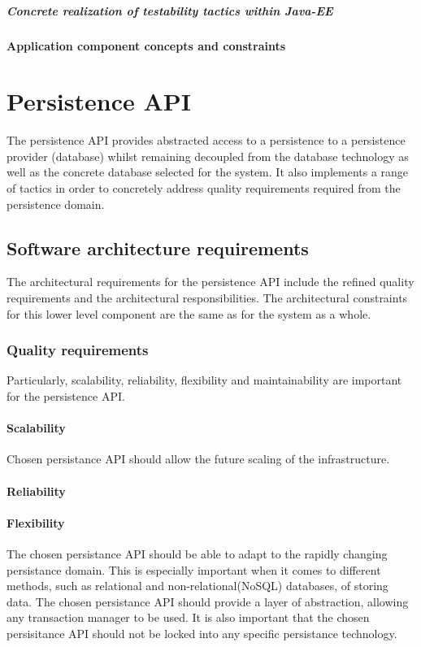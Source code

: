 \documentclass[a4paper,12pt]{report}
\begin{document}
\subparagraph {Concrete realization of testability tactics  within Java-EE}
\hfill \break

\paragraph {Application component concepts and constraints}


\section {Persistence API}
The persistence API provides abstracted access to a persistence to a persistence provider (database)
whilst remaining decoupled from the database technology as well as the concrete database selected
for the system. It also implements a range of tactics in order to concretely address quality requirements required from the persistence domain.

\subsection {Software architecture requirements}
The architectural requirements for the persistence API include the refined quality requirements and
the architectural responsibilities. The architectural constraints for this lower level component are
the same as for the system as a whole.

\subsubsection {Quality requirements}
Particularly, scalability, reliability, flexibility and maintainability are important for the persistence API.

\paragraph {Scalability}
\hfill \break
Chosen persistance API should allow the future scaling of the infrastructure.

\paragraph {Reliability}

\paragraph {Flexibility}
\hfill \break
The chosen persistance API should be able to adapt to the rapidly changing persistance domain. This is especially important when it comes to different methods, such as relational and non-relational(NoSQL) databases, of storing data. \newline 
The chosen persistance API should provide a layer of abstraction, allowing any transaction manager to be used. It is also important that the chosen persisitance API should not be locked into any specific persistance technology.
\end{document}
